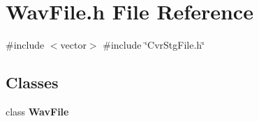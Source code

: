\section{Wav\+File.\+h File Reference}
\label{WavFile_8h}
{\ttfamily \#include $<$vector$>$}\newline
{\ttfamily \#include \char`\"{}Cvr\+Stg\+File.\+h\char`\"{}}\newline
\subsection*{Classes}
\begin{DoxyCompactItemize}
\item 
class \textbf{ Wav\+File}
\end{DoxyCompactItemize}
